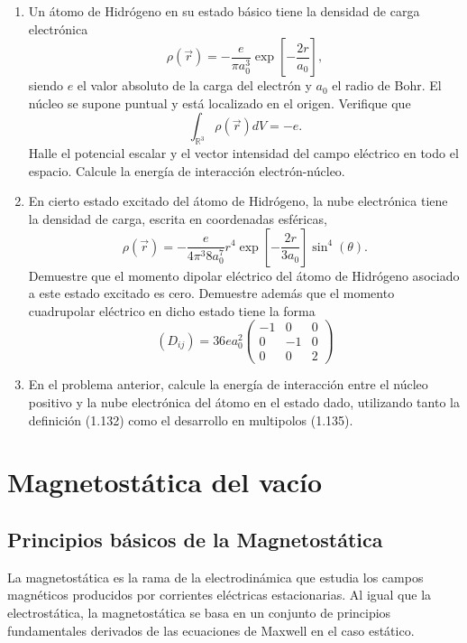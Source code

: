 \documentclass[12pt,a4paper]{book}
\begin{document}
\begin{enumerate}
\item Un átomo de Hidrógeno en su estado básico tiene la densidad de carga electrónica
\begin{equation*}
\rho(\vec{r}) = -\frac{e}{\pi a_0^3}\exp\left[-\frac{2r}{a_0}\right],
\end{equation*}
siendo $e$ el valor absoluto de la carga del electrón y $a_0$ el radio de Bohr. El núcleo se supone puntual y está localizado en el origen. Verifique que
\begin{equation*}
\int_{\mathbb{R}^3}\rho(\vec{r})dV = -e.
\end{equation*}
Halle el potencial escalar y el vector intensidad del campo eléctrico en todo el espacio. Calcule la energía de interacción electrón-núcleo.

\item En cierto estado excitado del átomo de Hidrógeno, la nube electrónica tiene la densidad de carga, escrita en coordenadas esféricas,
\begin{equation*}
\rho(\vec{r}) = -\frac{e}{4\pi^3 8a_0^7}r^4\exp\left[-\frac{2r}{3a_0}\right]\sin^4(\theta).
\end{equation*}
Demuestre que el momento dipolar eléctrico del átomo de Hidrógeno asociado a este estado excitado es cero. Demuestre además que el momento cuadrupolar eléctrico en dicho estado tiene la forma
\begin{equation*}
(D_{ij}) = 36ea_0^2 \begin{pmatrix}
-1 & 0 & 0 \\
0 & -1 & 0 \\
0 & 0 & 2
\end{pmatrix}
\end{equation*}

\item En el problema anterior, calcule la energía de interacción entre el núcleo positivo y la nube electrónica del átomo en el estado dado, utilizando tanto la definición (1.132) como el desarrollo en multipolos (1.135).
\end{enumerate}

\chapter{Magnetostática del vacío}
\section{Principios básicos de la Magnetostática}

La magnetostática es la rama de la electrodinámica que estudia los campos magnéticos producidos por corrientes eléctricas estacionarias. Al igual que la electrostática, la magnetostática se basa en un conjunto de principios fundamentales derivados de las ecuaciones de Maxwell en el caso estático.
\end{document}
